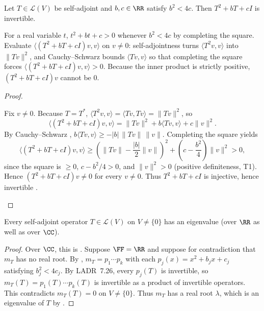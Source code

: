 \documentclass[10pt]{scrartcl}
\newcommand{\LL}{\mathcal L}\newcommand{\PP}{\mathcal P}\newcommand{\MM}{\mathcal M}
\begin{document}
\begin{proposition*}
  Let $T\in\LL(V)$ be self-adjoint and $b,c\in\RR$ satisfy $b^2<4c$. Then $T^2+bT+cI$ is invertible.
\end{proposition*}
\begin{ideabox}
  For a real variable $t$, $t^2+bt+c>0$ whenever $b^2<4c$ by completing the square. Evaluate $\langle (T^2+bT+cI)v,v\rangle$ on $v\neq0$: self-adjointness turns $\langle T^2v,v\rangle$ into $\|Tv\|^2$, and Cauchy--Schwarz bounds $\langle Tv,v\rangle$ so that completing the square forces $\langle (T^2+bT+cI)v,v\rangle > 0$. Because the inner product is strictly positive, $(T^2+bT+cI)v$ cannot be $0$.
\end{ideabox}
\begin{proof}
  \begin{steps}
    \ii Fix $v\neq0$. Because $T=T^*$, $\langle T^2v,v\rangle = \langle Tv,Tv\rangle = \|Tv\|^2$, so
    \[
      \langle(T^2+bT+cI)v,v\rangle = \|Tv\|^2 + b\langle Tv,v\rangle + c\|v\|^2.
    \]
    \ii By Cauchy--Schwarz , $b\langle Tv,v\rangle \ge -|b|\,\|Tv\|\,\|v\|$. Completing the square yields
    \[
      \langle(T^2+bT+cI)v,v\rangle \ge \left(\|Tv\| - \frac{|b|}{2}\|v\|\right)^2 + \left(c - \frac{b^2}{4}\right)\|v\|^2 > 0,
    \]
    since the square is $\ge0$, $c-b^2/4>0$, and $\|v\|^2>0$ (positive definiteness, T1).
    \ii Hence $(T^2+bT+cI)v\neq0$ for every $v\neq0$. Thus $T^2+bT+cI$ is injective, hence invertible .
  \end{steps}
\end{proof}

\begin{theorem*}
  Every self-adjoint operator $T\in\LL(V)$ on $V\neq\{0\}$ has an eigenvalue (over $\RR$ as well as over $\CC$).
\end{theorem*}
\begin{proof}
  Over $\CC$, this is . Suppose $\FF=\RR$ and suppose for contradiction that $m_T$ has no real root. By , $m_T=p_1\cdots p_k$ with each $p_j(x)=x^2+b_jx+c_j$ satisfying $b_j^2<4c_j$. By LADR~7.26, every $p_j(T)$ is invertible, so $m_T(T)=p_1(T)\cdots p_k(T)$ is invertible as a product of invertible operators. This contradicts $m_T(T)=0$ on $V\neq\{0\}$. Thus $m_T$ has a real root $\lambda$, which is an eigenvalue of $T$ by .
\end{proof}
\end{document}
